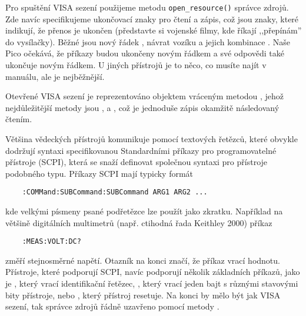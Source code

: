 Pro spuštění VISA sezení použijeme metodu \lstinline|open_resource()| správce zdrojů. Zde navíc specifikujeme ukončovací znaky pro čtení a zápis, což jsou znaky, které indikují, že přenos je ukončen (představte si vojenské filmy, kde říkají ,,přepínám'' do vysílačky). Běžné jsou nový řádek , návrat vozíku  a jejich kombinace . Naše Pico očekává, že příkazy budou ukončeny novým řádkem  a své odpovědi také ukončuje novým řádkem. U jiných přístrojů je to něco, co musíte najít v manuálu, ale  je nejběžnější.

Otevřené VISA sezení je reprezentováno objektem  vráceným metodou , jehož nejdůležitější metody jsou ,  a , což je jednoduše zápis okamžitě následovaný čtením.

Většina vědeckých přístrojů komunikuje pomocí textových řetězců, které obvykle dodržují syntaxi specifikovanou Standardními příkazy pro programovatelné přístroje (SCPI), která se snaží definovat společnou syntaxi pro přístroje podobného typu. Příkazy SCPI mají typicky formát
\begin{lstlisting}
    :COMMand:SUBCommand:SUBCommand ARG1 ARG2 ...
\end{lstlisting}
kde velkými písmeny psané podřetězce lze použít jako zkratku. Například na většině digitálních multimetrů (např. ctihodná řada Keithley 2000) příkaz
\begin{lstlisting}
    :MEAS:VOLT:DC?
\end{lstlisting}
změří stejnosměrné napětí. Otazník na konci značí, že příkaz vrací hodnotu. Přístroje, které podporují SCPI, navíc podporují několik základních příkazů, jako je , který vrací identifikační řetězec, , který vrací jeden bajt s různými stavovými bity přístroje, nebo , který přístroj resetuje. Na konci by mělo být jak VISA sezení, tak správce zdrojů řádně uzavřeno pomocí metody .

